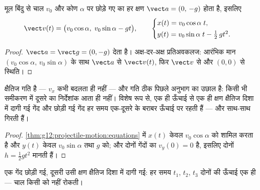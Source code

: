 \begin{theorem}[गति के समीकरण]\label{thm:g12:projectile-motion:equations}
मूल बिंदु से चाल $v_0$ और कोण $\alpha$ पर छोड़े गए  का हर
क्षण $\vect a = (0,\,-g)$ होता है, इसलिए
\[
\vect v(t) = \bigl(v_0\cos\alpha,\; v_0\sin\alpha - g t\bigr),
\qquad
\begin{cases}
x(t) = v_0\cos\alpha\; t,\\[2pt]
y(t) = v_0\sin\alpha\; t - \tfrac12\, g t^2 .
\end{cases}
\]
\end{theorem}

\begin{proof}
 $\vect a = \vect g = (0,-g)$ देता है। अक्ष-दर-अक्ष प्रतिअवकलज:
आरंभिक मान $(v_0\cos\alpha,\, v_0\sin\alpha)$ के साथ $\vect a$ से $\vect v(t)$, फिर $\vect v$ से और $(0,0)$ से
स्थिति।
\end{proof}

\begin{proposition}[दोनों गतियों की स्वतंत्रता]\label{prop:g12:projectile-motion:independence}
क्षैतिज गति  है --- $v_x$ कभी बदलता ही नहीं --- और  गति ठीक
पिछले अनुभाग का  उछाल है: किसी भी समीकरण में दूसरे का निर्देशांक आता
ही नहीं। विशेष रूप से, एक ही ऊँचाई से एक ही क्षण क्षैतिज दिशा में दागी गई गेंद
और छोड़ी गई गेंद हर समय एक-दूसरे के बराबर ऊँचाई पर रहती हैं --- और साथ-साथ
गिरती हैं।
\end{proposition}

\begin{proof}
\cref{thm:g12:projectile-motion:equations} में $x(t)$ केवल $v_0\cos\alpha$ को शामिल करता है और $y(t)$ केवल $v_0\sin\alpha$ तथा
$g$ को; और दोनों गेंदों का $v_y(0) = 0$ है, इसलिए दोनों $h = \tfrac12 gt^2$ मानती हैं।
\end{proof}

\begin{omfigure}

{\small एक गेंद छोड़ी गई, दूसरी उसी क्षण क्षैतिज दिशा में दागी गई: हर समय
$t_1$, $t_2$, $t_3$ दोनों की ऊँचाई एक ही --- चाल किसी को नहीं रोकती।}
\end{omfigure}

